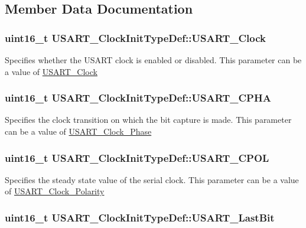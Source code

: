 \subsection{Member Data Documentation}
\hypertarget{structUSART__ClockInitTypeDef_a229ba7c3f9a4d6d56513e6899f6c6693}{
\subsubsection[{USART\_\-Clock}]{\setlength{\rightskip}{0pt plus 5cm}uint16\_\-t {\bf USART\_\-ClockInitTypeDef::USART\_\-Clock}}}
\label{structUSART__ClockInitTypeDef_a229ba7c3f9a4d6d56513e6899f6c6693}
Specifies whether the USART clock is enabled or disabled. This parameter can be a value of \hyperlink{group__USART__Clock}{USART\_\-Clock} \hypertarget{structUSART__ClockInitTypeDef_abda3a2172bd5819e1c207dc0d1c822d8}{
\subsubsection[{USART\_\-CPHA}]{\setlength{\rightskip}{0pt plus 5cm}uint16\_\-t {\bf USART\_\-ClockInitTypeDef::USART\_\-CPHA}}}
\label{structUSART__ClockInitTypeDef_abda3a2172bd5819e1c207dc0d1c822d8}
Specifies the clock transition on which the bit capture is made. This parameter can be a value of \hyperlink{group__USART__Clock__Phase}{USART\_\-Clock\_\-Phase} \hypertarget{structUSART__ClockInitTypeDef_a01450cba8a40cf9a624b25979dc6aa77}{
\subsubsection[{USART\_\-CPOL}]{\setlength{\rightskip}{0pt plus 5cm}uint16\_\-t {\bf USART\_\-ClockInitTypeDef::USART\_\-CPOL}}}
\label{structUSART__ClockInitTypeDef_a01450cba8a40cf9a624b25979dc6aa77}
Specifies the steady state value of the serial clock. This parameter can be a value of \hyperlink{group__USART__Clock__Polarity}{USART\_\-Clock\_\-Polarity} \hypertarget{structUSART__ClockInitTypeDef_ab1b28d63d2be6e57849666d78a4467bd}{
\subsubsection[{USART\_\-LastBit}]{\setlength{\rightskip}{0pt plus 5cm}uint16\_\-t {\bf USART\_\-ClockInitTypeDef::USART\_\-LastBit}}}

